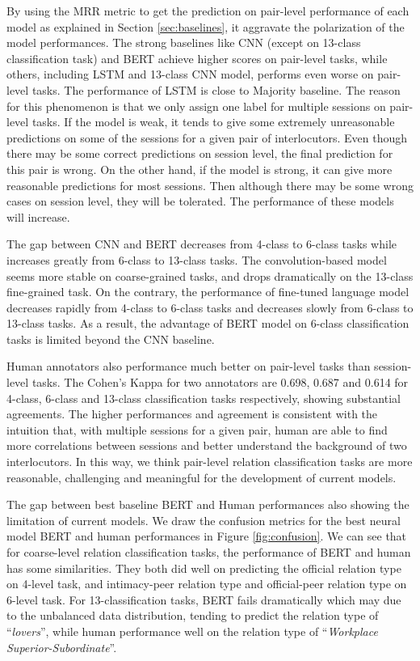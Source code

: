 \documentclass[letterpaper]{article} \usepackage{aaai21}  \usepackage{times}  \usepackage{helvet} \usepackage{courier}  \usepackage[hyphens]{url}  \usepackage{graphicx} \usepackage{xcolor}
\begin{document}
By using the MRR metric to get the prediction on pair-level performance of each model as explained in Section \ref{sec:baselines}, it aggravate the polarization of the model performances. The strong baselines like CNN (except on 13-class classification task) and BERT achieve higher scores on pair-level tasks, while others, including LSTM and 13-class CNN model, performs even worse on pair-level tasks. The performance of LSTM is close to Majority baseline. The reason for this phenomenon is that we only assign one label for multiple sessions on pair-level tasks. If the model is weak, it tends to give some extremely unreasonable predictions on some of the sessions for a given pair of interlocutors. Even though there may be some correct predictions on session level, the final prediction for this pair is wrong. On the other hand, if the model is strong, it can give more reasonable predictions for most sessions. Then although there may be some wrong cases on session level, they will be tolerated. The performance of these models will increase.

The gap between CNN and BERT decreases from 4-class to 6-class tasks while increases greatly from 6-class to 13-class tasks. The convolution-based model seems more stable on coarse-grained tasks, and drops dramatically on the 13-class fine-grained task. On the contrary, the performance of fine-tuned language model decreases rapidly from 4-class to 6-class tasks and decreases slowly from 6-class to 13-class tasks. As a result, the advantage of BERT model on 6-class classification tasks is limited beyond the CNN baseline.

Human annotators also performance much better on pair-level tasks than session-level tasks. The Cohen's Kappa for two annotators are 0.698, 0.687 and 0.614 for 4-class, 6-class and 13-class classification tasks respectively, showing substantial agreements. The higher performances and agreement is consistent with the intuition that, with multiple sessions for a given pair, human are able to find more correlations between sessions and better understand the background of two interlocutors. In this way, we think pair-level relation classification tasks are more reasonable, challenging and meaningful for the development of current models. 

The gap between best baseline BERT and Human performances also showing the limitation of current models. We draw the confusion metrics for the best neural model BERT and human performances in Figure \ref{fig:confusion}. We can see that for coarse-level relation classification tasks, the performance of BERT and human has some similarities. They both did well on predicting the official relation type on 4-level task, and intimacy-peer relation type and official-peer relation type on 6-level task. For 13-classification tasks, BERT fails dramatically which may due to the unbalanced data distribution, tending to predict the relation type of ``{\em lovers}'', while human performance well on the relation type of ``{\em Workplace Superior-Subordinate}''.
\end{document}
